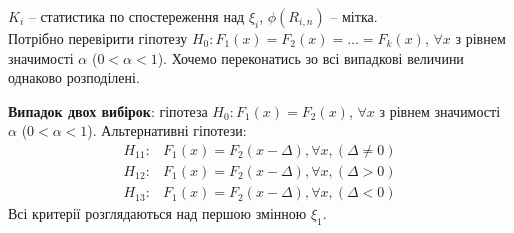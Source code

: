 $K_i$ -- статистика по спостереження над $\xi_i$, $\phi(R_{i,n})$ -- мітка. \\

Потрібно перевірити гіпотезу $H_0: F_1(x) = F_2(x) = \ldots = F_k(x)$, $\forall x$ з рівнем значимості $\alpha$ ($0 < \alpha < 1$). Хочемо переконатись зо всі випадкові величини однаково розподілені.

\textbf{Випадок двох вибірок}: гіпотеза $H_0: F_1(x) = F_2(x)$, $\forall x$ з рівнем значимості $\alpha$ ($0 < \alpha < 1$). Альтернативні гіпотези:
\begin{align*}
    H_{11}: & F_1(x) = F_2(x - \Delta), \forall x, (\Delta \ne 0) \\
    H_{12}: & F_1(x) = F_2(x - \Delta), \forall x, (\Delta > 0) \\
    H_{13}: & F_1(x) = F_2(x - \Delta), \forall x, (\Delta < 0)
\end{align*}
Всі критерії розглядаються над першою змінною $\xi_1$.


